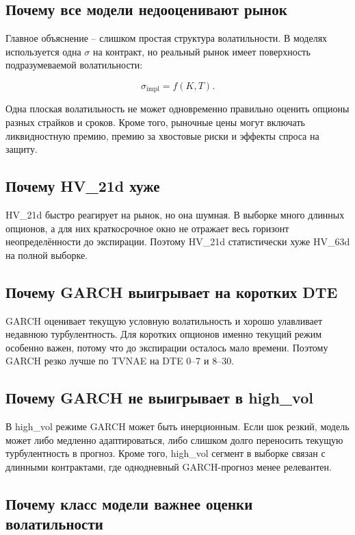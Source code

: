 \documentclass[11pt,a4paper]{article}
\begin{document}
\subsection{Почему все модели недооценивают рынок}

Главное объяснение -- слишком простая структура волатильности. В моделях используется одна $\sigma$ на контракт, но реальный рынок имеет поверхность подразумеваемой волатильности:

\begin{equation}
\sigma_{\text{impl}}=f(K,T).
\end{equation}

Одна плоская волатильность не может одновременно правильно оценить опционы разных страйков и сроков. Кроме того, рыночные цены могут включать ликвидностную премию, премию за хвостовые риски и эффекты спроса на защиту.

\subsection{Почему HV\_21d хуже}

HV\_21d быстро реагирует на рынок, но она шумная. В выборке много длинных опционов, а для них краткосрочное окно не отражает весь горизонт неопределённости до экспирации. Поэтому HV\_21d статистически хуже HV\_63d на полной выборке.

\subsection{Почему GARCH выигрывает на коротких DTE}

GARCH оценивает текущую условную волатильность и хорошо улавливает недавнюю турбулентность. Для коротких опционов именно текущий режим особенно важен, потому что до экспирации осталось мало времени. Поэтому GARCH резко лучше по TVNAE на DTE 0--7 и 8--30.

\subsection{Почему GARCH не выигрывает в high\_vol}

В high\_vol режиме GARCH может быть инерционным. Если шок резкий, модель может либо медленно адаптироваться, либо слишком долго переносить текущую турбулентность в прогноз. Кроме того, high\_vol сегмент в выборке связан с длинными контрактами, где однодневный GARCH-прогноз менее релевантен.

\subsection{Почему класс модели важнее оценки волатильности}
\end{document}
